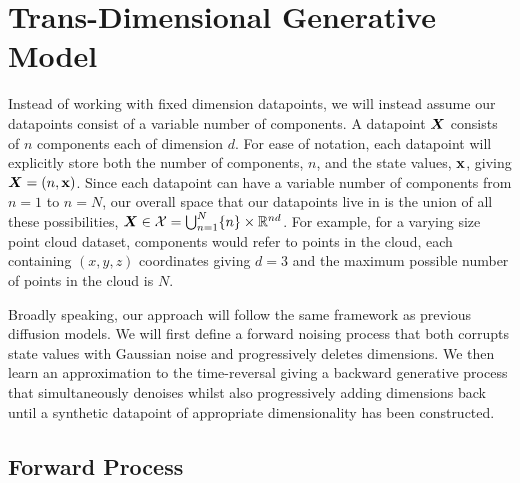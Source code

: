 \section{Trans-Dimensional Generative Model}
Instead of working with fixed dimension datapoints, we will instead assume our datapoints consist of a variable number of components. A datapoint ${\bm{X}}$ consists of $n$ components each of dimension $d$. For ease of notation, each datapoint will explicitly store both the number of components, $n$, and the state values, ${\mathbf{x}}$, giving ${\bm{X}} = (n, {\mathbf{x}})$. Since each datapoint can have a variable number of components from $n=1$ to $n=N$, our overall space that our datapoints live in is the union of all these possibilities, ${\bm{X}} \in {\mathcal{X}} = \bigcup_{n=1}^N \{n \} \times \mathbb{R}^{nd}$. For example, for a varying size point cloud dataset, components would refer to points in the cloud, each containing $(x,y,z)$ coordinates giving $d=3$ and the maximum possible number of points in the cloud is $N$.

Broadly speaking, our approach will follow the same framework as previous diffusion models. We will first define a forward noising process that both corrupts state values with Gaussian noise and progressively deletes dimensions.
We then learn an approximation to the time-reversal giving a backward generative process that simultaneously denoises whilst also progressively adding dimensions back until a synthetic datapoint of appropriate dimensionality has been constructed.

\subsection{Forward Process}
\label{sec:tddm-jump-diff-proc}

